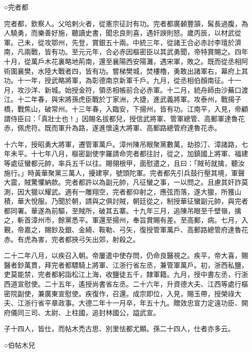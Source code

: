\begin{pinyinscope}
 ○完者都



 完者都，欽察人。父哈剌火者，從憲宗征討有功。完者都廣顙豐頷，髯長過腹，為人驍勇，而樂善好施，聽讀史書，聞忠良則喜，遇奸諛則怒。歲丙辰，以材武從軍。己未，從攻鄂州，先登，賞銀五十兩。中統三年，從諸王合必赤討李璮於濟南，凡兩戰，皆有功。至元元年，合必赤因樞密臣以其武勇聞，帝特賞賜之。四年十月，從萬戶木花裏略地荊南，還至襄陽西安陽灘，遇宋軍，敗之。既而從丞相阿術圍襄樊，水陸大戰者四，皆有功。嘗梯樊城，焚樓櫓，勇敢出諸軍右，幕府上其功。十一年，授武略將軍，為彰德南京新軍千戶。九月，從丞相伯顏南征。十一月，攻沙洋、新城。始授金符，領丞相帳前合必赤軍。十二月，統舟師由沙蕪口渡江。十二年春，與宋將孫虎臣戰於丁家洲，大捷，進武義將軍。攻泰州，戰揚子橋，戰焦山，破常州。十三年春，入臨安，下揚州，皆有功。江南平，入見，帝顧謂侍臣曰：「真壯士也！」因賜名拔都兒，授信武將軍、管軍總管、高郵軍達魯花赤，佩虎符。既而軍升為路，遂進懷遠大將軍、高郵路總管府達魯花赤。



 十六年，授昭勇大將軍，遷管軍萬戶。漳州陳吊眼聚黨數萬，劫掠汀、漳諸路，七年未平。十七年八月，樞密副使孛羅請命完者都往討，從之，加鎮國上將軍、福建等處征蠻都元帥，率兵五千以往。賜翎根甲，面慰遣之，且曰：「賊茍就擒，聽汝施行。」時黃華聚黨三萬人，擾建寧，號頭陀軍。完者都先引兵鼓行壓其境，軍聲大震，賊驚懼納款。完者都許以為副元帥，凡征蠻之事，一以問之。且慮其奸詐莫測，因大獵以耀武。適有一雕翔空，完者都仰射之，應弦而落，遂大獵，所獲山積，華大悅服。乃聞於朝，請與之俱討賊，朝廷從之，制授華征蠻副元帥，與完者都同署。華遂為前驅，至賊所，破其五寨。十九年三月，追陳吊眼至千壁嶺，擒之，斬首漳州市，餘黨悉平。軍還至揚州，奉旨賞賜有差。至高郵，病。七月，入覲，帝嘉之，賜鈔及銀、金綺、鞍勒、弓矢，復授管軍萬戶、高郵路總管府達魯花赤。有虎為害，完者都挾弓矢出郊，射殺之。



 二十二年八月，以疾召入朝。帝屢遣中使存問，仍命良醫視之。疾平，帝大喜，賜醫者鈔萬貫，拜完者都驃騎上將軍、江浙行省左丞，兼管軍萬戶。初，浙西私鹽，吏莫能禁，完者都躬詣松江上海，收鹽徒五千，隸軍籍。九月，授中書左丞，行浙西道宣慰使。二十五年，遙授尚書省左丞。二十六年，升資德大夫、江西等處行樞密院副使，兼廣東宣慰使。疾復作，召還。成宗即位，入見，賜玉帶，授榮祿大夫、江浙行省平章政事。大德二年十一月卒，年五十九。贈效忠宣力定遠功臣、開府儀同三司、太尉、上柱國，追封林國公，謚武宣。



 子十四人，皆仕，而帖木禿古思、別里怯都尤顯。孫二十四人，仕者亦多云。



 ○伯帖木兒




\end{pinyinscope}
